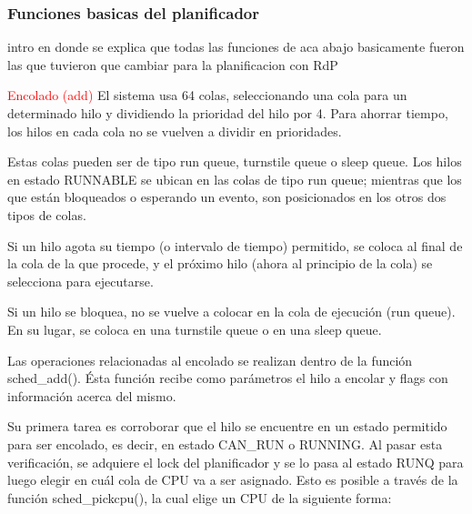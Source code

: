 \subsubsection*{Funciones basicas del planificador}

intro en donde se explica que todas las funciones de aca abajo basicamente fueron las que tuvieron que cambiar para la planificacion con RdP

\textcolor{red}{Encolado (add)}
El sistema usa 64 colas, seleccionando una cola para un determinado hilo y dividiendo la prioridad del hilo por 4. Para ahorrar tiempo, los hilos en cada cola no se vuelven a dividir en prioridades.\par

Estas colas pueden ser de tipo run queue, turnstile queue o sleep queue. Los hilos en estado RUNNABLE se ubican en las colas de tipo run queue; mientras que los que están bloqueados o esperando un evento, son posicionados en los otros dos tipos de colas.\par

Si un hilo agota su tiempo (o intervalo de tiempo) permitido, se coloca al final de la cola de la que procede, y el próximo hilo (ahora al principio de la cola) se selecciona para ejecutarse.\par

Si un hilo se bloquea, no se vuelve a colocar en la cola de ejecución (run queue). En su lugar, se coloca en una turnstile queue o en una sleep queue.\par

Las operaciones relacionadas al encolado se realizan dentro de la función sched\_add(). Ésta función recibe como parámetros el hilo a encolar y flags con información acerca del mismo.\par

Su primera tarea es corroborar que el hilo se encuentre en un estado permitido para ser encolado, es decir, en estado CAN\_RUN o RUNNING. Al pasar esta verificación, se adquiere el lock del planificador y se lo pasa al estado RUNQ para luego elegir en cuál cola de CPU va a ser asignado. Esto es posible a través de la función sched\_pickcpu(), la cual elige un CPU de la siguiente forma:


